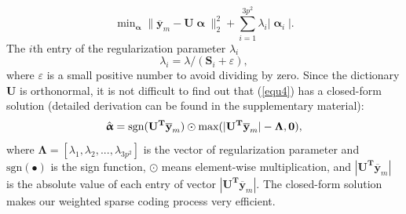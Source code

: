 \documentclass[10pt,twocolumn,letterpaper]{article}
\begin{document}
\begin{equation}\label{equ10}
\min\nolimits_{\boldsymbol{\upalpha}}\|\mathbf{\overline{y}}_{m}-\mathbf{U}\boldsymbol{\upalpha}\|_{2}^{2}+\sum_{i=1}^{3p^{2}}\lambda_{i}|\boldsymbol{\upalpha}_{i}|.
\end{equation}
The $i$th entry of the regularization parameter $\lambda_{i}$ 
\begin{equation}\label{equ11}
\lambda_{i} = \lambda/(\mathbf{S}_{i}+\varepsilon),
\end{equation}
where $\varepsilon$ is a small positive number to avoid dividing by zero. Since the dictionary $\mathbf{U}$ is orthonormal, it is not difficult to find out that (\ref{equ4}) has a closed-form solution (detailed derivation can be found in the supplementary material):
\begin{equation}\label{equ12}
\setlength{\abovedisplayskip}{3pt}
\setlength{\belowdisplayskip}{4pt}
\hat{\boldsymbol{\upalpha}}= \text{sgn}(\mathbf{U^{T}\overline{y}}_{m})\odot \text{max}(|\mathbf{U^{T}\overline{y}}_{m}|-\mathbf{\Lambda},\mathbf{0}),
\end{equation}
where $\mathbf{\Lambda} = [\lambda_{1},\lambda_{2},...,\lambda_{3p^2}]$ is the vector of regularization parameter and $\text{sgn}(\bullet)$ is the sign function, $\odot$ means element-wise multiplication, and $|\mathbf{U^{T}\overline{y}}_{m}|$ is the absolute value of each entry of vector $|\mathbf{U^{T}\overline{y}}_{m}|$. The closed-form solution makes our weighted sparse coding process very efficient. 


\end{document}

